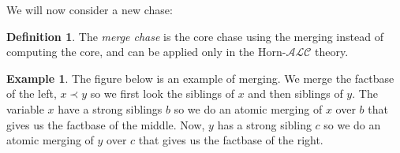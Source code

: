 \documentclass{article}
\theoremstyle{definition}
\newtheorem{definition}{Definition}[section]
\newtheorem{example}{Example}[section]
\theoremstyle{remark}
\begin{document}
We will now consider a new chase:

\begin{definition}
The \emph{merge chase} is the core chase using the merging instead of computing the core, and can be applied only in the Horn-$\mathcal{ALC}$ theory. 
\end{definition}



\begin{example} 
The figure below is an example of merging. We merge the factbase of the left, $x \prec y$ so we first look the siblings of $x$ and then siblings of $y$. The variable $x$ have a strong siblings $b$ so we do an atomic merging of $x$ over $b$ that gives us the factbase of the middle. Now, $y$ has a strong sibling $c$ so we do an atomic merging of $y$ over $c$ that gives us the factbase of the right.


\end{example}
\end{document}
